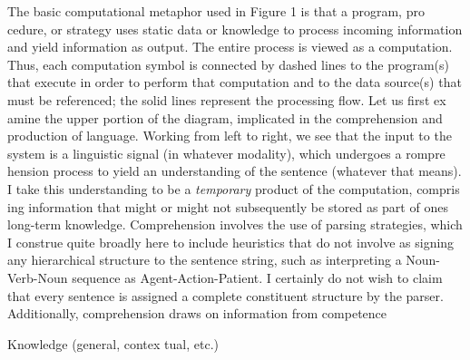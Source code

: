 \begin{styleTextbody}
The basic computational metaphor used in Figure 1 is that a program, pro\- cedure, or strategy uses static data or knowledge to process incoming information and yield information as output. The entire process is viewed as a computation. Thus, each computation symbol is connected by dashed lines to the program(s) that execute in order to perform that computation and to the data source(s) that must be referenced; the solid lines represent the processing flow. Let us first ex\- amine the upper portion of the diagram, implicated in the comprehension and production of language. Working from left to right, we see that the input to the system is a linguistic signal (in whatever modality), which undergoes a rompre hension process to yield an understanding of the sentence (whatever that means). I take this understanding to be a \textit{temporary}\textit{ }product of the computation, compris\- ing information that might or might not subsequently be stored as part of one{\textquotesingle}s long-term knowledge. Comprehension involves the use of parsing strategies, which I construe quite broadly here to include heuristics that do not involve as\- signing any hierarchical structure to the sentence string, such as interpreting a Noun-Verb-Noun sequence as Agent-Action-Patient. I certainly do not wish to claim that every sentence is assigned a complete constituent structure by the parser. Additionally, comprehension draws on information from competence
\end{styleTextbody}


\clearpage\setcounter{page}{1}\begin{styleStandard}
Knowledge (general, contex\- tual, etc.)
\end{styleStandard}


